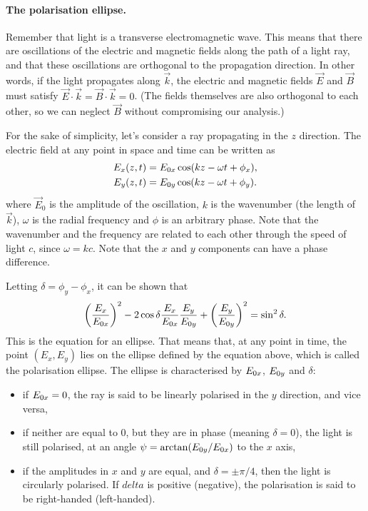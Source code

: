 \paragraph{The polarisation ellipse.} Remember that light is a transverse electromagnetic wave. This means that there are oscillations of the electric and magnetic fields along the path of a light ray, and that these oscillations are orthogonal to the propagation direction. In other words, if the light propagates along $\vec{k}$, the electric and magnetic fields $\vec{E}$ and $\vec{B}$ must satisfy $ \vec{E} \cdot \vec{k} = \vec{B} \cdot \vec{k} = 0$. (The fields themselves are also orthogonal to each other, so we can neglect $ \vec{B} $ without compromising our analysis.)

For the sake of simplicity, let's consider a ray propagating in the $ z $ direction. The electric field at any point in space and time can be written as
\begin{align}
	E_x(z, t) &= E_{0x} \cos(kz-\omega t + \phi_x),\\
	E_y(z, t) &= E_{0y} \cos(kz-\omega t + \phi_y).
\end{align}
where $ \vec{E}_0 $ is the amplitude of the oscillation, $ k $ is the wavenumber (the length of $ \vec{k} $), $ \omega $ is the radial frequency and $ \phi $ is an arbitrary phase. Note that the wavenumber and the frequency are related to each other through the speed of light $ c $, since $ \omega = kc$. Note that the $ x $ and $ y $ components can have a phase difference.

Letting $ \delta = \phi_y-\phi_x $, it can be shown that 
\begin{equation}
	\left(\frac{E_x}{E_{0x}}\right)^2 - 2\cos\delta\frac{E_x}{E_{0x}}\frac{E_y}{E_{0y}} + \left(\frac{E_y}{E_{0y}}\right)^2 = \sin^2\delta.
\end{equation}
This is the equation for an ellipse. That means that, at any point in time, the point $ (E_x, E_y) $ lies on the ellipse defined by the equation above, which is called the polarisation ellipse. The ellipse is characterised by $ E_{0x} $, $ E_{0y} $ and $ \delta $:
\begin{itemize}
	\item if $ E_{0x} = 0 $, the ray is said to be linearly polarised in the $ y $ direction, and vice versa,
	\item if neither are equal to 0, but they are in phase (meaning $ \delta=0 $), the light is still polarised, at an angle $ \psi = \arctan(E_{0y}/E_{0x}) $ to the $ x $ axis,
	\item if the amplitudes in $ x $ and $ y $ are equal, and $ \delta = \pm \pi/4 $, then the light is circularly polarised. If $ delta $ is positive (negative), the polarisation is said to be right-handed (left-handed). 
\end{itemize}

